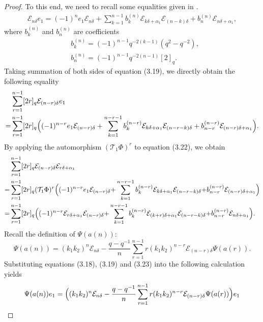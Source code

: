 \documentclass[12pt]{amsart}
\numberwithin{equation}{section}
\numberwithin{equation}{section}
\begin{document}
\begin{proof}
To this end, we need to recall some equalities given in \cite{11}.
\begin{align}
\mathcal{E}_{n\delta}e_1
=(-1)^{n}e_1\mathcal{E}_{n\delta}+\sum\limits_{k=1}^{n-1}b^{(n)}_k\mathcal{E}_{k\delta+\alpha_1}\mathcal{E}_{(n-k)\delta}+b^{(n)}_{n}\mathcal{E}_{n\delta+\alpha_1},
\end{align}
where \(b^{(n)}_k\) and \(b^{(n)}_n\) are coefficients
\begin{align}
&b^{(n)}_{k} = (-1)^{n-1}q^{-2(k-1)}(q^2 - q^{-2}), \\
&b^{(n)}_{n} = (-1)^{n-1}q^{-2(n-1)}[2]_q. 
\end{align}
Taking summation of both sides of equation (3.19), we directly obtain the following equality
\begin{align}
&\sum\limits_{r=1}^{n-1}[2r]_q\mathcal{E}_{(n-r)\delta}e_1\nonumber\\
=&\sum\limits_{r=1}^{n-1}[2r]_q\Bigl((-1)^{n-r}e_1\mathcal{E}_{(n-r)\delta}+\sum\limits_{k=1}^{n-r-1}b^{(n-r)}_k\mathcal{E}_{k\delta+\alpha_1}\mathcal{E}_{(n-r-k)\delta}+b^{(n-r)}_{n-r}\mathcal{E}_{(n-r)\delta+\alpha_1}\Bigr).
\end{align}
By applying the automorphism \((\mathcal{T}_1\Phi)^r\)  to equation (3.22), we obtain
\begin{align}
&\sum\limits_{r=1}^{n-1}[2r]_q\mathcal{E}_{(n-r)\delta}\mathcal{E}_{r\delta+\alpha_1}\nonumber\\
=&\sum\limits_{r=1}^{n-1}[2r]_q(\mathcal{T}_1\Phi)^r\Bigl((-1)^{n-r}e_1\mathcal{E}_{(n-r)\delta}{+}\sum\limits_{k=1}^{n-r-1}b^{(n-r)}_k\mathcal{E}_{k\delta+\alpha_1}\mathcal{E}_{(n-r-k)\delta}{+}b^{(n-r)}_{n-r}\mathcal{E}_{(n-r)\delta+\alpha_1}\Bigr)\nonumber\\
=&\sum\limits_{r=1}^{n-1}[2r]_q\Bigl((-1)^{n-r}\mathcal{E}_{r\delta+\alpha_1}\mathcal{E}_{(n-r)\delta}{+}\sum\limits_{k=1}^{n-r-1}b^{(n-r)}_k\mathcal{E}_{(k+r)\delta+\alpha_1}\mathcal{E}_{(n-r-k)\delta}{+}b^{(n-r)}_{n-r}\mathcal{E}_{n\delta+\alpha_1}\Bigr).
\end{align}
Recall the definition of \(\Psi(a(n))\):
\[
\Psi(a(n)) = (k_1k_2)^n\mathcal{E}_{n\delta} - \frac{q - q^{-1}}{n}\sum\limits_{r=1}^{n-1}r(k_1k_2)^{n-r}\mathcal{E}_{(n-r)\delta}\Psi(a(r)).
\]
Substituting equations (3.18), (3.19) and (3.23) into the following calculation yields
\begin{align*}
\Psi(a(n))e_1 &=\Bigl((k_1k_2)^n\mathcal{E}_{n\delta} - \frac{q - q^{-1}}{n}\sum\limits_{r=1}^{n-1}r(k_1k_2)^{n-r}\mathcal{E}_{(n-r)\delta}\Psi(a(r))\Bigr)e_1\\

\end{align*}
\end{proof}
\end{document}
